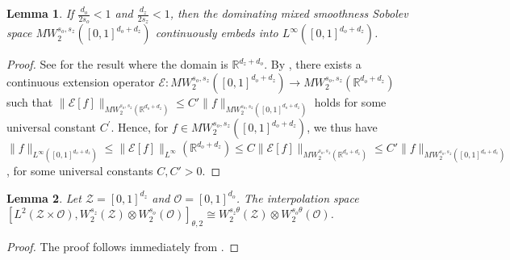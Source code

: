 \documentclass[11pt]{article}
\newcommand{\calZ}{\mathcal{Z}}
\newcommand{\calE}{\mathcal{E}}
\newcommand{\calO}{\mathcal{O}}
\newcommand{\R}{\mathbb{R}}
\newcommand{\0}{\mathbf{0}}
\newtheorem{lem}{Lemma}[section]
\begin{document}
\begin{appendix}
\begin{lem}
\label{lem:anisotropic_sobolev_embedding}
    If $\frac{d_o}{2s_o}< 1 $ and $\frac{d_z}{2s_z} < 1$, then the dominating mixed smoothness Sobolev space $MW^{s_o,s_z}_2([0,1]^{d_o+d_z})$ continuously embeds into $L^{\infty}([0,1]^{d_o+d_z})$.
\end{lem}
\begin{proof}
    See \cite[Equation 1.13]{schmeisser2007recent} for the result where the domain is $\R^{d_z+d_o}$. By \cite{devore1993besov}, there exists a continuous extension operator $\calE: MW^{s_o,s_z}_2([0,1]^{d_o+d_z})\to MW^{s_o,s_z}_2(\R^{d_o + d_z})$ such that $\|\calE[f]\|_{MW^{s_o,s_z}_2(\R^{d_o+d_z})} \leq C' \|f\|_{MW^{s_o,s_z}_2([0,1]^{d_o+d_z})}$ holds for some universal constant $C^\prime$.
    Hence, for $f\in MW^{s_o,s_z}_2([0,1]^{d_o+d_z})$, we thus have $\|f\|_{L^{\infty}([0,1]^{d_o+d_z})}\leq \|\calE[f]\|_{L^\infty}(\R^{d_o+d_z}) \leq C \|\calE[f]\|_{MW^{s_o,s_z}_2(\R^{d_o+d_z})} \leq C' \|f\|_{MW^{s_o,s_z}_2([0,1]^{d_o+d_z})}$, for some universal constants $C,C'>0$. 
\end{proof}


\begin{lem}\label{lem:tensor_interpolation}
    Let $\calZ=[0,1]^{d_z}$ and $\calO = [0,1]^{d_o}$.  The interpolation space $[L^2(\calZ\times\calO), W_2^{s_z}(\calZ) \otimes W_2^{s_o}(\calO)]_{\theta,2} \cong W_2^{s_z \theta}(\calZ) \otimes W_2^{s_o \theta}(\calO)$.
\end{lem}
\begin{proof}
    The proof follows immediately from \cite{defant2000complex}.
\end{proof}



\end{appendix}
\end{document}
